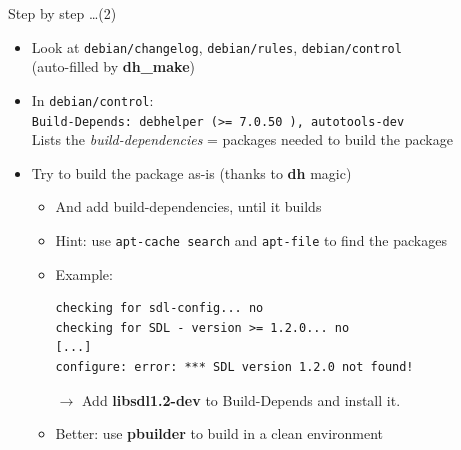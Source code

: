 \documentclass[10pt,final]{beamer}
\begin{document}
\begin{frame}[fragile]{Step by step \ldots (2)}
\begin{itemize}
	\item Look at \texttt{debian/changelog}, \texttt{debian/rules}, \texttt{debian/control}\\
		(auto-filled by \textbf{dh\_make})
		\hbr
	\item In \texttt{debian/control}:\\
		\texttt{Build-Depends: debhelper (>= 7.0.50~), autotools-dev}\\
		Lists the \textsl{build-dependencies} = packages needed to build the package
		\hbr
	\item Try to build the package as-is (thanks to \textbf{dh} magic)
		\begin{itemize}
			\item And add build-dependencies, until it builds
			\item Hint: use \texttt{apt-cache search} and \texttt{apt-file} to find the packages
			\item Example:
\begin{lstlisting}[basicstyle=\ttfamily\footnotesize]
checking for sdl-config... no
checking for SDL - version >= 1.2.0... no
[...]
configure: error: *** SDL version 1.2.0 not found!
\end{lstlisting}
$\rightarrow$ Add \textbf{libsdl1.2-dev} to Build-Depends and install it.
		\hbr
	\item Better: use \textbf{pbuilder} to build in a clean environment
		\end{itemize}
\end{itemize}
\end{frame}
\end{document}
